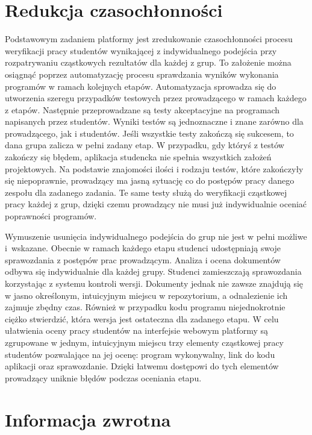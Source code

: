 \section{Redukcja czasochłonności}

Podstawowym zadaniem platformy jest zredukowanie czasochłonności procesu weryfikacji pracy studentów wynikającej z indywidualnego podejścia przy rozpatrywaniu cząstkowych rezultatów dla każdej z grup.
To założenie można osiągnąć poprzez automatyzację procesu sprawdzania wyników wykonania programów w ramach kolejnych etapów.
Automatyzacja sprowadza się do utworzenia szeregu przypadków testowych przez prowadzącego w ramach każdego z etapów.
Następnie przeprowadzane są testy akceptacyjne na programach napisanych przez studentów.
Wyniki testów są jednoznaczne i znane zarówno dla prowadzącego, jak i studentów.
Jeśli wszystkie testy zakończą się sukcesem, to dana grupa zalicza w pełni zadany etap.
W przypadku, gdy któryś z testów zakończy się błędem, aplikacja studencka nie spełnia wszystkich założeń projektowych.
Na podstawie znajomości ilości i rodzaju testów, które zakończyły się niepoprawnie, prowadzący ma jasną sytuację co do postępów pracy danego zespołu dla zadanego zadania.
Te same testy służą do weryfikacji cząstkowej pracy każdej z grup, dzięki czemu prowadzący nie musi już indywidualnie oceniać poprawności programów.

Wymuszenie usunięcia indywidualnego podejścia do grup nie jest w pełni możliwe i~wskazane.
Obecnie w ramach każdego etapu studenci udostępniają swoje sprawozdania z postępów prac prowadzącym.
Analiza i ocena dokumentów odbywa się indywidualnie dla każdej grupy.
Studenci zamieszczają sprawozdania korzystając z systemu kontroli wersji.
Dokumenty jednak nie zawsze znajdują się w jasno określonym, intuicyjnym miejscu w repozytorium, a odnalezienie ich zajmuje zbędny czas.
Również w przypadku kodu programu niejednokrotnie ciężko stwierdzić, która wersja jest ostateczna dla zadanego etapu.
W celu ułatwienia oceny pracy studentów na interfejsie webowym platformy są zgrupowane w jednym, intuicyjnym miejscu trzy elementy cząstkowej pracy studentów pozwalające na jej ocenę: program wykonywalny, link do kodu aplikacji oraz sprawozdanie.
Dzięki łatwemu dostępowi do tych elementów prowadzący uniknie błędów podczas oceniania etapu.


\section{Informacja zwrotna}

